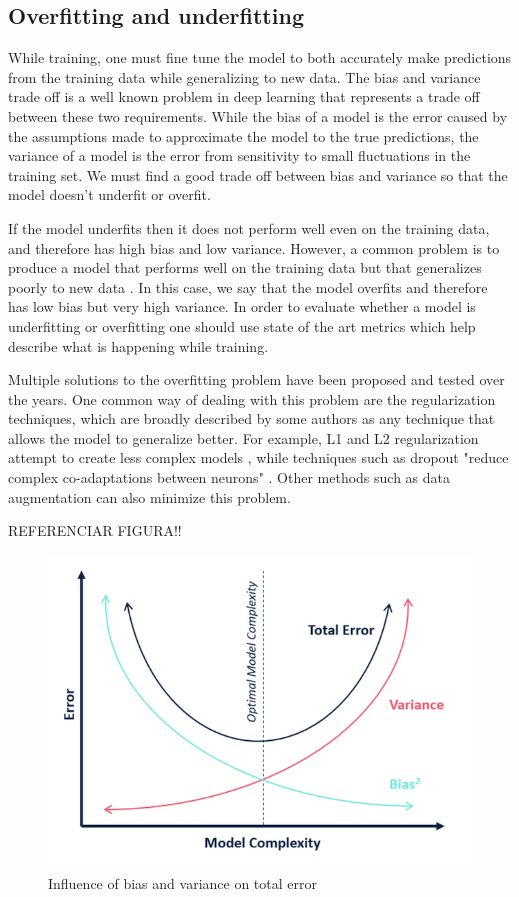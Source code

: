 \subsection{Overfitting and underfitting}
While training, one must fine tune the model to both accurately make predictions from the training data while generalizing to new data. The bias and variance trade off is a well known problem in deep learning that represents a trade off between these two requirements. While the bias of a model is the error caused by the assumptions made to approximate the model to the true predictions, the variance of a model is the error from sensitivity to small fluctuations in the training set. We must find a good trade off between bias and variance so that the model doesn't underfit or overfit. \par
If the model underfits then it does not perform well even on the training data, and therefore has high bias and low variance. However, a common problem is to produce a model that performs well on the training data but that generalizes poorly to new data \cite{Grus}. In this case, we say that the model overfits and therefore has low bias but very high variance. In order to evaluate whether a model is underfitting or overfitting one should use state of the art metrics which help describe what is happening while training. \par  
Multiple solutions to the overfitting problem have been proposed and tested over the years. One common way of dealing with this problem are the regularization techniques, which are broadly described by some authors as any technique that allows the model to generalize better. For example, L1 and L2 regularization attempt to create less complex models \cite{Ng}, while techniques such as dropout "reduce complex co-adaptations between neurons" \cite{Hinton2012}. Other methods such as data augmentation can also minimize this problem.

REFERENCIAR FIGURA!!
\begin{figure}[ht]
  \centering
    \includegraphics[width=0.5\linewidth]{figs/bias_variance_tradeoff.png}
  \caption{Influence of bias and variance on total error}
  \label{fig:biasvariancetradeoff}
\end{figure}

